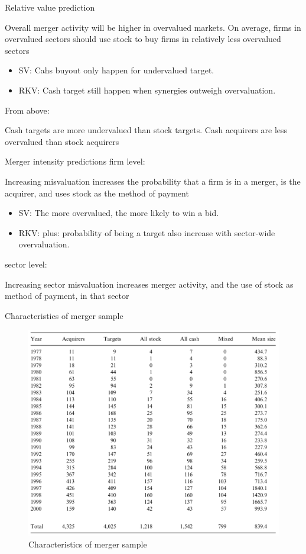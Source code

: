 \documentclass[aspectratio=169,xcolor=dvipsnames]{beamer}
\begin{document}
\begin{frame}{Relative value prediction}
    \begin{block}{Overall merger activity will be higher in overvalued markets. On average, firms in overvalued sectors should use stock to buy firms in relatively less overvalued sectors}
        \begin{itemize}
            \item SV: Cahs buyout only happen for undervalued target.
            \item RKV: Cash target still happen when synergies outweigh overvaluation.
        \end{itemize}
    \end{block}

    From above:

    \begin{block}{Cash targets are more undervalued than stock targets. Cash acquirers are less overvalued than stock acquirers}
    \end{block}

\end{frame}

\begin{frame}{Merger intensity predictions}
    firm level:
    \begin{block}{Increasing misvaluation increases the probability that a firm is in a merger, is the acquirer, and uses stock as the method of payment}

        \begin{itemize}
            \item SV: The more overvalued, the more likely to win a bid.
            \item RKV: plus: probability of being a target also increase with sector-wide overvaluation.
        \end{itemize}
    \end{block}
    sector level:
    \begin{block}{Increasing sector misvaluation increases merger activity, and the use of stock as method of payment, in that sector}
    \end{block}

\end{frame}

\begin{frame}{Characteristics of merger sample}
    \begin{figure}
        \includegraphics[width=0.55\linewidth]{figures/p2_table1.png}
        \caption{Characteristics of merger sample}
    \end{figure}
\end{frame}
\end{document}
